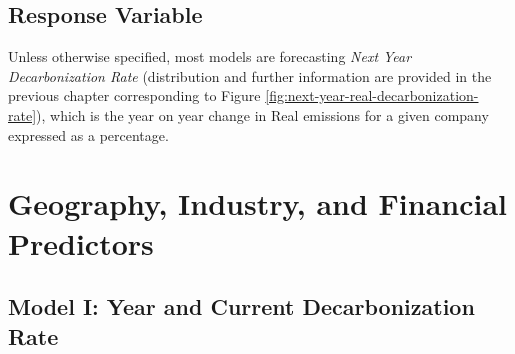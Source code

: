 \subsection{Response Variable}
\noindent Unless otherwise specified, most models are forecasting \textit{Next Year Decarbonization Rate} (distribution and further information are provided in the previous chapter corresponding to Figure \ref{fig:next-year-real-decarbonization-rate}), which is the year on year change in Real emissions for a given company expressed as a percentage. 

\section{Geography, Industry, and Financial Predictors}

\subsection{Model I: Year and Current Decarbonization Rate}


